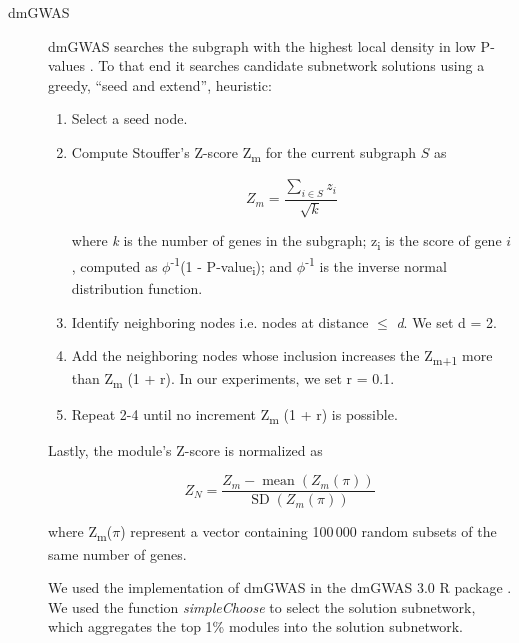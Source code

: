 \documentclass[twocolumn, 11pt, draft]{article}
\begin{document}
\begin{description}
\item[{dmGWAS}] dmGWAS searches the subgraph with the highest local density in low P-values \cite{jia_dmgwas:_2011}. To that end it searches candidate subnetwork solutions using a greedy, ``seed and extend'', heuristic:

\begin{enumerate}
\item Select a seed node.
\item Compute Stouffer's Z-score Z\textsubscript{m} for the current subgraph $S$ as

\begin{equation*} 
Z_m = \frac{\sum_{i \in S} z_i}{\sqrt{k}}
\end{equation*}

where \emph{k} is the number of genes in the subgraph; z\textsubscript{i} is the score of gene $i$, computed as \(\phi\)\textsuperscript{-1}(1 - P-value\textsubscript{i}); and \(\phi\)\textsuperscript{-1} is the inverse normal distribution function.
\item Identify neighboring nodes i.e. nodes at distance \(\le\) \emph{d}. We set d = 2.
\item Add the neighboring nodes whose inclusion increases the Z\textsubscript{m+1} more than Z\textsubscript{m} \texttimes{} (1 + r). In our experiments, we set r = 0.1.
\item Repeat 2-4 until no increment Z\textsubscript{m} \texttimes{} (1 + r) is possible.
\end{enumerate}

Lastly, the module's Z-score is normalized as

\begin{equation*}
Z_{N}=\frac{Z_{m}-\operatorname{mean}\left(Z_{m}(\pi)\right)}{\operatorname{SD}\left(Z_{m}(\pi)\right)}
\end{equation*} 

where Z\textsubscript{m}(\(\pi\)) represent a vector containing 100\,000 random subsets of the same number of genes.

We used the implementation of dmGWAS in the dmGWAS 3.0 R package \cite{dmgwas}. We used the function \emph{simpleChoose} to select the solution subnetwork, which aggregates the top 1\% modules into the solution subnetwork.
\end{description}
\end{document}
